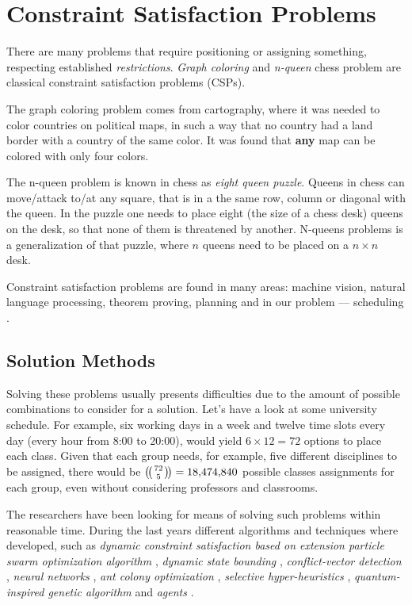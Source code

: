 \documentclass[ThesisDoc]{subfiles}
\begin{document}
\chapter{Constraint Satisfaction Problems}
\label{chapter:csp}

There are many problems that require positioning or assigning something,
respecting established \emph{restrictions}. \emph{Graph coloring} and
\emph{n-queen} chess problem are classical constraint satisfaction problems (CSPs).


The graph coloring problem comes from cartography, where it was needed to color
countries on political maps, in such a way that no country had a land border with
a country of the same color. It was found that \textbf{any} map can be colored
with only four colors.

The n-queen problem is known in chess as \emph{eight queen puzzle}.
Queens in chess can move/attack to/at any square,
that is in a the same row, column or diagonal with the queen.
In the puzzle one needs to place eight (the size of a chess desk)
queens on the desk, so that none of them is threatened by another.
N-queens problems is a generalization of that puzzle, where $n$ queens need
to be placed on a $n \times n$ desk.

Constraint satisfaction problems are found in many areas:
machine vision, natural language processing, theorem proving,
planning and in our problem --- scheduling \cite{MAS}.



\section{Solution Methods}
  Solving these problems usually presents difficulties due to the amount of
possible combinations to consider for a solution. Let's have a look at
some university schedule.
  For example, six working days in a week and twelve time slots every day
(every hour from 8:00 to 20:00), would yield $6 \times 12 = 72$ options
to place each class.
  Given that each group needs, for example, five different disciplines to be assigned,
there would be $\multibinom{72}{5} = \num[group-separator={,}]{18474840}$
possible classes assignments for each group,
even without considering professors and classrooms.

\medskip
\noindent
The researchers have been looking for means of solving such problems within
reasonable time. During the last years different algorithms and techniques where
developed, such as
\emph{dynamic constraint satisfaction based on extension particle swarm
      optimization algorithm} \cite{CSPswarm},
\emph{dynamic state bounding} \cite{CSPdynStateBound},
\emph{conflict-vector detection} \cite{CSPtimetable},
\emph{neural networks} \cite{CSPneuro},
\emph{ant colony optimization} \cite{CSPcunningACO, CSPlimmemACO},
\emph{selective hyper-heuristics} \cite{CSPhypHeur},
\emph{quantum-inspired genetic algorithm} \cite{QuantumGeneticAlgorithm}
and \emph{agents} \cite{CSPagent2013, CSPagent2014, DCSPagent1998}.
\end{document}
